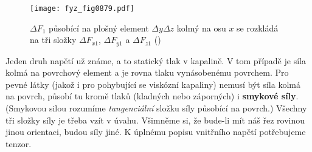     \begin{figure}[ht!] %
      \centering
      \texttt{[image: fyz\_fig0879.pdf]}
      \caption{\(\Delta F_1\) působící na plošný element \(\Delta y\Delta z\) kolmý na osu \(x\) se
              rozkládá na tři složky \(\Delta F_{x1}\), \(\Delta F_{y1}\) a \(\Delta F_{z1}\)
              (\cite[s.~584]{Feynman02})}
      \label{fyz:fig0879}
    \end{figure}

    Jeden druh napětí už známe, a to statický tlak v kapalině. V tom případě je síla kolmá na
    povrchový element a je rovna tlaku vynásobenému povrchem. Pro pevné látky (jakož i pro
    pohybující se viskózní kapaliny) nemusí být síla kolmá na povrch, působí tu kromě tlaků
    (kladných nebo záporných) i \textbf{smykové síly}. (Smykovou silou rozumíme \emph{tangenciální}
    složku síly působící na povrch.) Všechny tři složky síly je třeba vzít v úvahu. Všimněme si, že
    bude-li mít náš řez rovinou jinou orientaci, budou síly jiné. K úplnému popisu vnitřního napětí
    potřebujeme tenzor.
    
